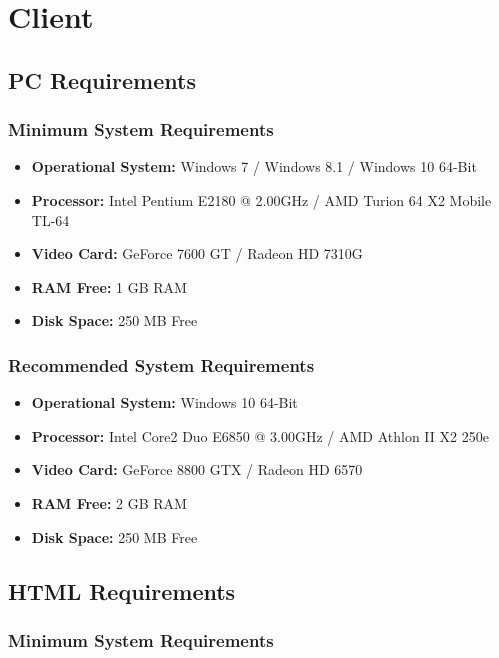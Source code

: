 \section{Client}

\subsection{PC Requirements}

\subsubsection{Minimum System Requirements}

\begin {itemize}	
	\item \textbf{Operational System:} Windows 7 / Windows 8.1 / Windows 10 64-Bit
	\item \textbf{Processor: } Intel Pentium E2180 @ 2.00GHz / AMD Turion 64 X2 Mobile TL-64
	\item \textbf{Video Card:}  GeForce 7600 GT / Radeon HD 7310G
	\item \textbf{RAM Free:}  1 GB RAM
	\item \textbf{Disk Space:} 250 MB Free

\end {itemize}

\subsubsection{Recommended System Requirements}

\begin {itemize}	
	\item \textbf{Operational System:} Windows 10 64-Bit
	\item \textbf{Processor: } Intel Core2 Duo E6850 @ 3.00GHz / AMD Athlon II X2 250e
	\item \textbf{Video Card:}  GeForce 8800 GTX / Radeon HD 6570
	\item \textbf{RAM Free:}  2 GB RAM
	\item \textbf{Disk Space:} 250 MB Free
\end {itemize}

\subsection{HTML Requirements}

\subsubsection{Minimum System Requirements}

